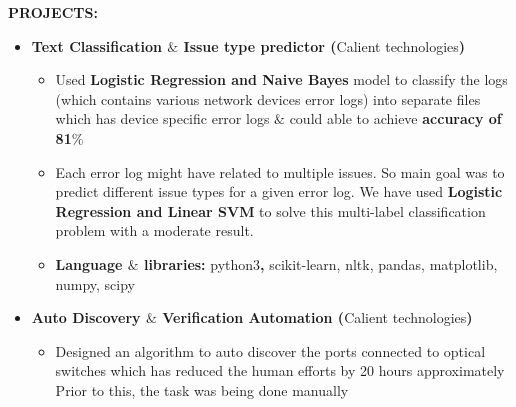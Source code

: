 \documentclass[12pt]{article}
\begin{document}
\vspace{\baselineskip}

\vspace{\baselineskip}

\vspace{\baselineskip}
\begin{FlushLeft}
{\fontsize{14pt}{16.8pt}\selectfont \textbf{PROJECTS:}\par}
\end{FlushLeft}\par

\begin{itemize}
	\item {\fontsize{14pt}{16.8pt}\selectfont \textbf{Text Classification $\&$  Issue type predictor (}Calient technologies\textbf{)}\par}\par

\begin{itemize}
	\item Used \textbf{Logistic Regression and Naive Bayes} model to classify the logs (which contains various network devices error logs) into separate files which has device specific error logs $\&$  could able to achieve \textbf{accuracy of} \textbf{81$\%$ }\par

	\item Each error log might have related to multiple issues. So main goal was to predict different issue types for a given error log. We have used\textbf{ Logistic Regression and Linear SVM }to solve this multi-label classification problem with a moderate result.\par

	\item \textbf{Language $\&$  libraries: }python3\textbf{, }scikit-learn, nltk, pandas, matplotlib, numpy, scipy\\
\par


\end{itemize}
	\item {\fontsize{14pt}{16.8pt}\selectfont \textbf{Auto Discovery $\&$  Verification Automation (}Calient technologies\textbf{)}\par}\par

\begin{itemize}
	\item Designed an algorithm to auto discover the ports connected to optical switches which has reduced the human efforts by 20 hours approximately Prior to this, the task was being done manually\par


\end{itemize}
\end{itemize}
\end{document}
